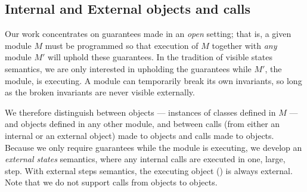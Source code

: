  

 
\subsection{Internal and External objects and calls}
\label{s:concepts}

Our work concentrates on guarantees made in an \emph{open} setting; that is, a given module
$M$ must be programmed so that %
execution of $M$ together with \emph{any} \externalM 
module $M'$ will uphold these guarantees. In the tradition of
visible states semantics, we are  only interested in upholding the guarantees while 
$M'$, the  \emph{\externalM} module, is executing. A module can
temporarily break its own invariants,
so long as the broken invariants are never visible externally.
   
We therefore distinguish between \emph{\internalO}
objects --- instances of classes defined in $M$ ---
and \emph{\externalO} objects defined in any other module, and
between \emph{\internalC} calls  (from either an internal or an external object)  made %
 to \internalO objects and \emph{\externalC} calls made %
 to \externalC objects. %
%
%
Because we only require guarantees while 
the  \externalM module  is executing,
we develop an \emph{external states} semantics, where
 any internal calls are executed in one, large, step.
With external steps semantics,  the executing object () is always   external. 
Note that we do not support calls from
\internalO objects to \externalO objects.
 

\newcommand{\vertsp} {\vspace{.05in}} 
 
